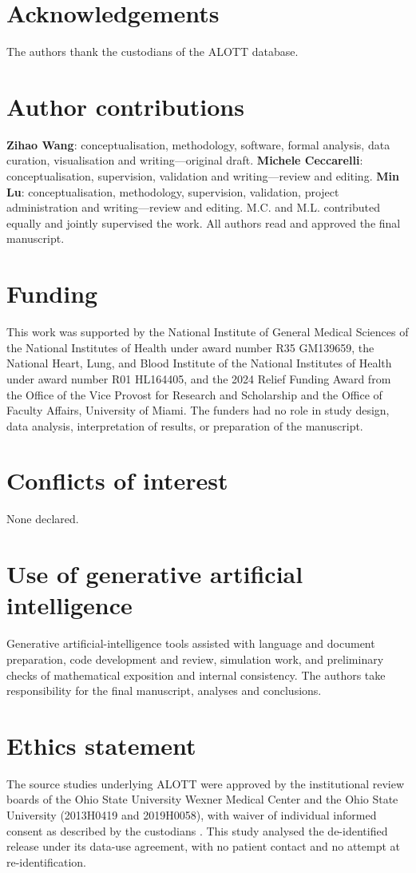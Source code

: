 \documentclass[11pt,letterpaper]{article}
\begin{document}
\section*{Acknowledgements}
The authors thank the custodians of the ALOTT database.

\section*{Author contributions}
\textbf{Zihao Wang}: conceptualisation, methodology, software, formal analysis, data curation, visualisation and writing---original draft.
\textbf{Michele Ceccarelli}: conceptualisation, supervision, validation and writing---review and editing.
\textbf{Min Lu}: conceptualisation, methodology, supervision, validation, project administration and writing---review and editing.
M.C. and M.L. contributed equally and jointly supervised the work. All authors read and approved the final manuscript.

\section*{Funding}
This work was supported by the National Institute of General Medical Sciences of the National Institutes of Health under award number R35 GM139659, the National Heart, Lung, and Blood Institute of the National Institutes of Health under award number R01 HL164405, and the 2024 Relief Funding Award from the Office of the Vice Provost for Research and Scholarship and the Office of Faculty Affairs, University of Miami. The funders had no role in study design, data analysis, interpretation of results, or preparation of the manuscript.

\section*{Conflicts of interest}
None declared.

\section*{Use of generative artificial intelligence}
Generative artificial-intelligence tools assisted with language and document preparation, code development and review, simulation work, and preliminary checks of mathematical exposition and internal consistency. The authors take responsibility for the final manuscript, analyses and conclusions.

\section*{Ethics statement}
The source studies underlying ALOTT were approved by the institutional review boards of the Ohio State University Wexner Medical Center and the Ohio State University (2013H0419 and 2019H0058), with waiver of individual informed consent as described by the custodians \citep{alott2025}. This study analysed the de-identified release under its data-use agreement, with no patient contact and no attempt at re-identification.
\end{document}
